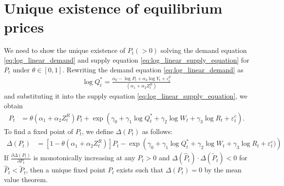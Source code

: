 \documentclass[11pt, a4paper]{article}
\begin{document}
\section{Unique existence of equilibrium prices}
We need to show the unique existence of $P_{t}(>0)$ solving the demand equation \eqref{eq:log_linear_demand} and supply equation \eqref{eq:log_linear_supply_equation} for $P_{t}$ under $\theta\in[0,1]$.
Rewriting the demand equation \eqref{eq:log_linear_demand} as 
\begin{align*}
    \log Q_t^*= \frac{\alpha_0 - \log P_{t} + \alpha_3 \log Y_t + \varepsilon^{d}_{t}}{(\alpha_1 + \alpha_2 Z^{R}_{t})}   
\end{align*}
and substituting it into the supply equation \eqref{eq:log_linear_supply_equation}, we obtain
\begin{align}
    P_t &=\theta (\alpha_1 + \alpha_2 Z^{R}_{t}) P_t + \exp\left(\gamma_0 + \gamma_1 \log Q^*_t +  \gamma_2 \log W_{t} + \gamma_3 \log R_t + \varepsilon^{c}_{t}\right). \label{eq:equilibrium_equation}
\end{align}
To find a fixed point of $P_{t}$, we define $\Delta(P_t)$ as follows:
\begin{align*}
    \Delta(P_t)
    &= [1 - \theta (\alpha_1 + \alpha_2 Z^{R}_{t})]P_t - \exp\left( \gamma_0 + \gamma_1 \log Q_t^* + \gamma_2 \log W_{t} + \gamma_3 \log R_t + \varepsilon^{c}_{t})\right)
\end{align*}
If $\frac{\partial\Delta(P_t)}{\partial P_t}$ is monotonically increasing at any $P_{t}>0$ and $\Delta(\hat{P}_t)\cdot \Delta(\tilde{P}_t)<0$ for $\hat{P}_t < \tilde{P}_t$, then a unique fixed point $P_t$ exists such that $\Delta(P_t)=0$ by the mean value theorem.
\end{document}
